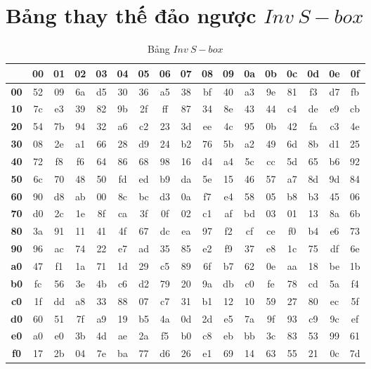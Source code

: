 \section{Bảng thay thế đảo ngược $Inv~S-box$}
\begin{table}[H]
	\centering
	\caption{Bảng $Inv~S-box$}
	\setlength{\tabcolsep}{3pt} %
	\begin{tabular}{|c|c|c|c|c|c|c|c|c|c|c|c|c|c|c|c|c|}
		\hline
		& \textbf{00} & \textbf{01} & \textbf{02} & \textbf{03} & \textbf{04} & \textbf{05} & \textbf{06} & \textbf{07} & \textbf{08} & \textbf{09} & \textbf{0a} & \textbf{0b} & \textbf{0c} & \textbf{0d} & \textbf{0e} & \textbf{0f} \\ \hline
		\textbf{00} & 52 & 09 & 6a & d5 & 30 & 36 & a5 & 38 & bf & 40 & a3 & 9e & 81 & f3 & d7 & fb \\ \hline
		\textbf{10} & 7c & e3 & 39 & 82 & 9b & 2f & ff & 87 & 34 & 8e & 43 & 44 & c4 & de & e9 & cb \\ \hline
		\textbf{20} & 54 & 7b & 94 & 32 & a6 & c2 & 23 & 3d & ee & 4c & 95 & 0b & 42 & fa & c3 & 4e \\ \hline
		\textbf{30} & 08 & 2e & a1 & 66 & 28 & d9 & 24 & b2 & 76 & 5b & a2 & 49 & 6d & 8b & d1 & 25 \\ \hline
		\textbf{40} & 72 & f8 & f6 & 64 & 86 & 68 & 98 & 16 & d4 & a4 & 5c & cc & 5d & 65 & b6 & 92 \\ \hline
		\textbf{50} & 6c & 70 & 48 & 50 & fd & ed & b9 & da & 5e & 15 & 46 & 57 & a7 & 8d & 9d & 84 \\ \hline
		\textbf{60} & 90 & d8 & ab & 00 & 8c & bc & d3 & 0a & f7 & e4 & 58 & 05 & b8 & b3 & 45 & 06 \\ \hline
		\textbf{70} & d0 & 2c & 1e & 8f & ca & 3f & 0f & 02 & c1 & af & bd & 03 & 01 & 13 & 8a & 6b \\ \hline
		\textbf{80} & 3a & 91 & 11 & 41 & 4f & 67 & dc & ea & 97 & f2 & cf & ce & f0 & b4 & e6 & 73 \\ \hline
		\textbf{90} & 96 & ac & 74 & 22 & e7 & ad & 35 & 85 & e2 & f9 & 37 & e8 & 1c & 75 & df & 6e \\ \hline
		\textbf{a0} & 47 & f1 & 1a & 71 & 1d & 29 & c5 & 89 & 6f & b7 & 62 & 0e & aa & 18 & be & 1b \\ \hline
		\textbf{b0} & fc & 56 & 3e & 4b & c6 & d2 & 79 & 20 & 9a & db & c0 & fe & 78 & cd & 5a & f4 \\ \hline
		\textbf{c0} & 1f & dd & a8 & 33 & 88 & 07 & c7 & 31 & b1 & 12 & 10 & 59 & 27 & 80 & ec & 5f \\ \hline
		\textbf{d0} & 60 & 51 & 7f & a9 & 19 & b5 & 4a & 0d & 2d & e5 & 7a & 9f & 93 & c9 & 9c & ef \\ \hline
		\textbf{e0} & a0 & e0 & 3b & 4d & ae & 2a & f5 & b0 & c8 & eb & bb & 3c & 83 & 53 & 99 & 61 \\ \hline
		\textbf{f0} & 17 & 2b & 04 & 7e & ba & 77 & d6 & 26 & e1 & 69 & 14 & 63 & 55 & 21 & 0c & 7d \\ \hline
	\end{tabular}
\end{table}

